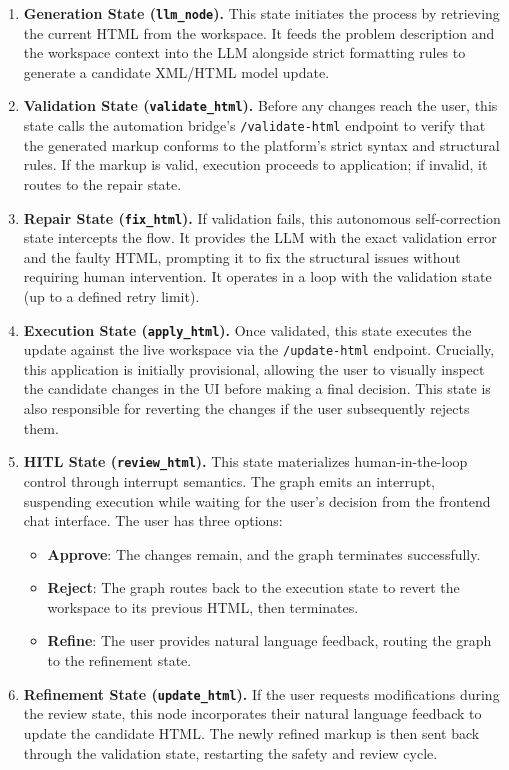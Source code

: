 \begin{enumerate}
\item \textbf{Generation State (\texttt{llm\_node}).}
This state initiates the process by retrieving the current HTML from the workspace. It feeds the problem description and the workspace context into the LLM alongside strict formatting rules to generate a candidate XML/HTML model update.

\item \textbf{Validation State (\texttt{validate\_html}).}
Before any changes reach the user, this state calls the automation bridge's \texttt{/validate-html} endpoint to verify that the generated markup conforms to the platform's strict syntax and structural rules. If the markup is valid, execution proceeds to application; if invalid, it routes to the repair state.

\item \textbf{Repair State (\texttt{fix\_html}).}
If validation fails, this autonomous self-correction state intercepts the flow. It provides the LLM with the exact validation error and the faulty HTML, prompting it to fix the structural issues without requiring human intervention. It operates in a loop with the validation state (up to a defined retry limit).

\item \textbf{Execution State (\texttt{apply\_html}).}
Once validated, this state executes the update against the live workspace via the \texttt{/update-html} endpoint. Crucially, this application is initially provisional, allowing the user to visually inspect the candidate changes in the UI before making a final decision. This state is also responsible for reverting the changes if the user subsequently rejects them.

\item \textbf{HITL State (\texttt{review\_html}).}
This state materializes human-in-the-loop control through interrupt semantics. The graph emits an interrupt, suspending execution while waiting for the user's decision from the frontend chat interface. The user has three options:
\begin{itemize}
    \item \textbf{Approve}: The changes remain, and the graph terminates successfully.
    \item \textbf{Reject}: The graph routes back to the execution state to revert the workspace to its previous HTML, then terminates.
    \item \textbf{Refine}: The user provides natural language feedback, routing the graph to the refinement state.
\end{itemize}

\item \textbf{Refinement State (\texttt{update\_html}).}
If the user requests modifications during the review state, this node incorporates their natural language feedback to update the candidate HTML. The newly refined markup is then sent back through the validation state, restarting the safety and review cycle.
\end{enumerate}


